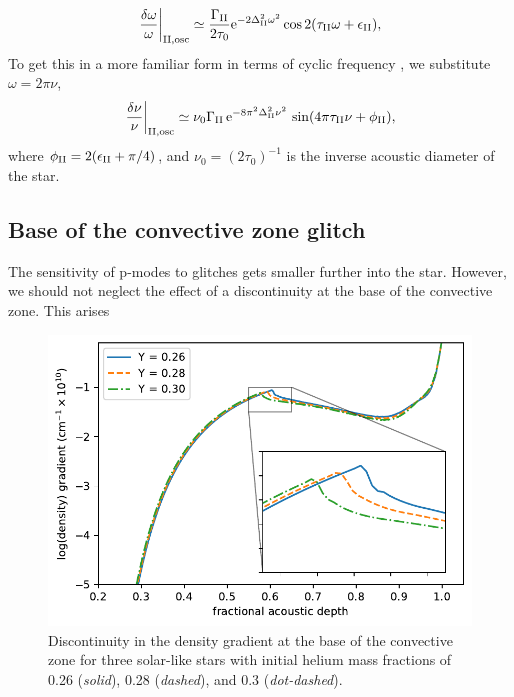 %
\begin{equation}
    \left.\frac{\delta\omega}{\omega}\right|_{{\mathrm{II}}, \mathrm{osc}} \simeq \frac{\Gamma_{{\mathrm{II}}}}{2 \tau_0} \mathrm{e}^{- 2 \Delta_{{\mathrm{II}}}^2 \omega^2} \cos 2 (\tau_{{\mathrm{II}}}\omega + \epsilon_{{\mathrm{II}}}),
\end{equation}
%
To get this in a more familiar form in terms of cyclic frequency \citep[e.g.][]{Verma.Faria.ea2014,Verma.Raodeo.ea2017}, we substitute \(\omega = 2\pi\nu\),
%
\begin{equation}
    \left.\frac{\delta\nu}{\nu}\right|_{{\mathrm{II}}, \mathrm{osc}} \simeq \nu_0 \Gamma_{{\mathrm{II}}} \, \mathrm{e}^{- 8 \pi^2 \Delta_{{\mathrm{II}}}^2 \nu^2} \, \sin ( 4 \pi \tau_{{\mathrm{II}}} \nu + \phi_{{\mathrm{II}}}), \label{eq:he-osc}
\end{equation}
%
where \(\phi_{{\mathrm{II}}} = 2(\epsilon_{{\mathrm{II}}} + \pi/4)\), and \(\nu_0 = (2 \tau_0)^{-1}\) is the inverse acoustic diameter of the star.

\subsection{Base of the convective zone glitch}\label{sec:bcz-glitch}

The sensitivity of p-modes to glitches gets smaller further into the star. However, we should not neglect the effect of a discontinuity at the base of the convective zone. This arises 

\begin{figure}
    \centering
    \includegraphics{figures/bcz-density-gradient.pdf}
    \caption{Discontinuity in the density gradient at the base of the convective zone for three solar-like stars with initial helium mass fractions of 0.26 (\emph{solid}), 0.28 (\emph{dashed}), and 0.3 (\emph{dot-dashed}).}
    \label{fig:bcz-density}
\end{figure}


